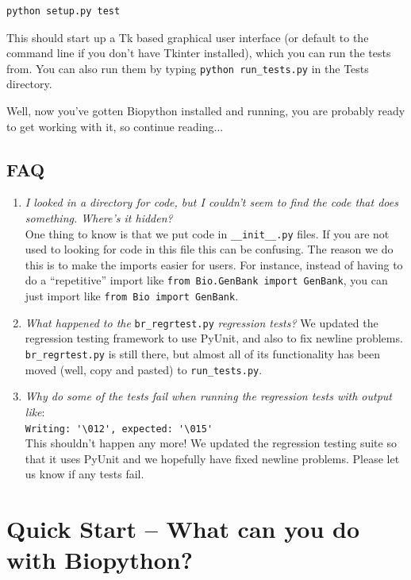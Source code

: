 \documentclass{report}
\begin{document}
\begin{verbatim}
python setup.py test
\end{verbatim}

This should start up a Tk based graphical user interface (or default to the command line if you don't have Tkinter installed), which you can run the tests from. You can also run them by typing \verb|python run_tests.py| in the Tests directory.


Well, now you've gotten Biopython installed and running, you are probably ready to get working with it, so continue reading...

\section{FAQ}

\begin{enumerate}
  \item \emph{I looked in a directory for code, but I couldn't seem to find the code that does something. Where's it hidden?} \\
  One thing to know is that we put code in \verb|__init__.py| files. If you are not used to looking for code in this file this can be confusing. The reason we do this is to make the imports easier for users. For instance, instead of having to do a ``repetitive'' import like \verb|from Bio.GenBank import GenBank|, you can just import like \verb|from Bio import GenBank|.

  \item \emph{What happened to the} \verb|br_regrtest.py| \emph{regression tests?}
  We updated the regression testing framework to use PyUnit, and also to fix newline problems. \verb|br_regrtest.py| is still there, but almost all of its functionality has been moved (well, copy and pasted) to \verb|run_tests.py|.

  \item \emph{Why do some of the tests fail when running the regression tests with output like}: \\
\verb|Writing: '\012', expected: '\015'| \\
 This shouldn't happen any more! We updated the regression testing suite so that it uses PyUnit and we hopefully have fixed newline problems. Please let us know if any tests fail.
\end{enumerate}

\chapter{Quick Start -- What can you do with Biopython?}
\end{document}
